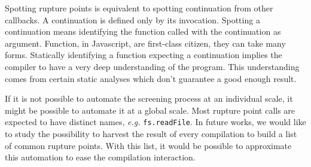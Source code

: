 Spotting rupture points is equivalent to spotting continuation from other callbacks.
A continuation is defined only by its invocation.
Spotting a continuation means identifying the function called with the continuation as argument.
Function, in Javascript, are first-class citizen, they can take many forms.
Statically identifying a function expecting a continuation implies the compiler to have a very deep understanding of the program.
This understanding comes from certain static analyses which don't guarantee a good enough result.

If it is not possible to automate the screening process at an individual scale, it might be possible to automate it at a global scale.
Most rupture point calls are expected to have distinct names, \textit{e.g.} \texttt{fs.readFile}.
In future works, we would like to study the possibility to harvest the result of every compilation to build a list of common rupture points.
With this list, it would be possible to approximate this automation to ease the compilation interaction.

